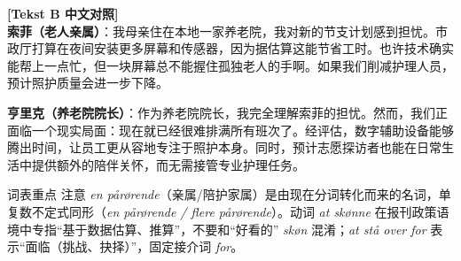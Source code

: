 \begin{transbox}
\small
\textbf{\color{NCDTeal}[Tekst B 中文对照]}\\
\textbf{索菲（老人亲属）}：我母亲住在本地一家养老院，我对新的节支计划感到担忧。市政厅打算在夜间安装更多屏幕和传感器，因为据估算这能节省工时。也许技术确实能帮上一点忙，但一块屏幕总不能握住孤独老人的手啊。如果我们削减护理人员，预计照护质量会进一步下降。

\textbf{亨里克（养老院院长）}：作为养老院院长，我完全理解索菲的担忧。然而，我们正面临一个现实局面：现在就已经很难排满所有班次了。经评估，数字辅助设备能够腾出时间，让员工更从容地专注于照护本身。同时，预计志愿探访者也能在日常生活中提供额外的陪伴关怀，而无需接管专业护理任务。
\end{transbox}


\begin{tipbox}{词表重点}
注意 \textit{en pårørende}（亲属/陪护家属）是由现在分词转化而来的名词，单复数不定式同形（\textit{en pårørende / flere pårørende}）。动词 \textit{at skønne} 在报刊政策语境中专指“基于数据估算、推算”，不要和“好看的” \textit{skøn} 混淆；\textit{at stå over for} 表示“面临（挑战、抉择）”，固定接介词 \textit{for}。
\end{tipbox}

